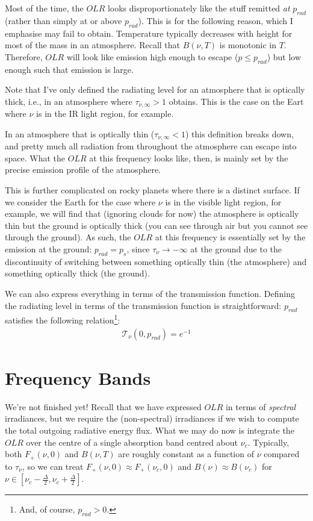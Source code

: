 Most of the time, the $OLR$ looks disproportionately like the stuff remitted \textit{at} $p_{rad}$ (rather than simply at or above $p_{rad}$). This is for the following reason, which I emphasise may fail to obtain. Temperature typically decreases with height for most of the mass in an atmosphere. Recall that $B(\nu,T)$ is monotonic in $T$. Therefore, $OLR$ will look like emission high enough to escape ($p\leq p_{rad}$) but low enough such that emission is large.

Note that I've only defined the radiating level for an atmosphere that is optically thick, i.e., in an atmosphere where $\tau_{\nu,\infty}>1$ obtains. This is the case on the Eart where $\nu$ is in the IR light region, for example.

In an atmosphere that is optically thin ($\tau_{\nu,\infty}<1$) this definition breaks down, and pretty much all radiation from throughout the atmosphere can escape into space. What the $OLR$ at this frequency looks like, then, is mainly set by the precise emission profile of the atmosphere.

This is further complicated on rocky planets where there is a distinct surface. If we consider the Earth for the case where $\nu$ is in the visible light region, for example, we will find that (ignoring clouds for now) the atmosphere is optically thin but the ground is optically thick (you can see through air but you cannot see through the ground). As such, the $OLR$ at this frequency is essentially set by the emission at the ground: $p_{rad}=p_s$, since $\tau_\nu\to-\infty$ at the ground due to the discontinuity of switching between something optically thin (the atmosphere) and something optically thick (the ground).

We can also express everything in terms of the transmission function. Defining the radiating level in terms of the transmission function is straightforward: $p_{rad}$ satisfies the following relation\footnote{And, of course, $p_{rad}>0$.}:
\begin{align}
    \mathcal{T}_\nu(0,p_{rad})=e^{-1}
\end{align}

\section{Frequency Bands}\label{Frequency Bands}

We're not finished yet! Recall that we have expressed $OLR$ in terms of \textit{spectral} irradiances, but we require the (non-spectral) irradiances if we wish to compute the total outgoing radiative energy flux. What we may do now is integrate the $OLR$ over the centre of a single absorption band centred about $\nu_c$. Typically, both $F_+(\nu,0)$ and $B(\nu,T)$ are roughly constant as a function of $\nu$ compared to $\tau_\nu$, so we can treat $F_+(\nu,0)\approx F_+(\nu_c,0)$ and $B(\nu)\approx B(\nu_c)$ for $\nu\in[\nu_c-\frac{\Delta}{2},\nu_c+\frac{\Delta}{2}]$.

